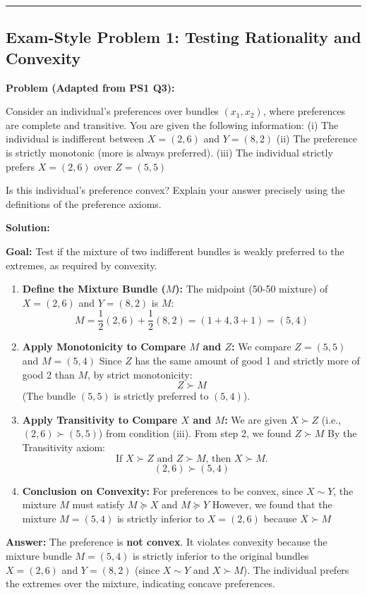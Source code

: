 \documentclass{article}
\begin{document}
\noindent\rule{\textwidth}{0.4pt}

\subsection*{Exam-Style Problem 1: Testing Rationality and Convexity}

\textbf{Problem (Adapted from PS1 Q3):}

Consider an individual's preferences over bundles $(x_1, x_2)$, where preferences are complete and transitive. You are given the following information: (i) The individual is indifferent between $X = (2, 6)$ and $Y = (8, 2)$ (ii) The preference is strictly monotonic (more is always preferred). (iii) The individual strictly prefers $X = (2, 6)$ over $Z = (5, 5)$

Is this individual's preference convex? Explain your answer precisely using the definitions of the preference axioms.

\textbf{Solution:}

\textbf{Goal:} Test if the mixture of two indifferent bundles is weakly preferred to the extremes, as required by convexity.

\begin{enumerate}
    \item \textbf{Define the Mixture Bundle ($M$):} The midpoint (50-50 mixture) of $X=(2, 6)$ and $Y=(8, 2)$ is $M$: \[M = \frac{1}{2}(2, 6) + \frac{1}{2}(8, 2) = (1+4, 3+1) = (5, 4)\]
    \item \textbf{Apply Monotonicity to Compare $M$ and $Z$:} We compare $Z=(5, 5)$ and $M=(5, 4)$ Since $Z$ has the same amount of good 1 and strictly more of good 2 than $M$, by strict monotonicity: \[Z \succ M\] (The bundle $(5, 5)$ is strictly preferred to $(5, 4)$).
    \item \textbf{Apply Transitivity to Compare $X$ and $M$:} We are given $X \succ Z$ (i.e., $(2, 6) \succ (5, 5)$) from condition (iii). From step 2, we found $Z \succ M$ By the Transitivity axiom: \[\text{If } X \succ Z \text{ and } Z \succ M \text{, then } X \succ M.\] \[(2, 6) \succ (5, 4)\]
    \item \textbf{Conclusion on Convexity:} For preferences to be convex, since $X \sim Y$, the mixture $M$ must satisfy $M \succeq X$ and $M \succeq Y$ However, we found that the mixture $M=(5, 4)$ is strictly inferior to $X=(2, 6)$ because $X \succ M$
\end{enumerate}

\textbf{Answer:} The preference is \textbf{not convex}. It violates convexity because the mixture bundle $M=(5, 4)$ is strictly inferior to the original bundles $X=(2, 6)$ and $Y=(8, 2)$ (since $X \sim Y$ and $X \succ M$). The individual prefers the extremes over the mixture, indicating concave preferences.
\end{document}
